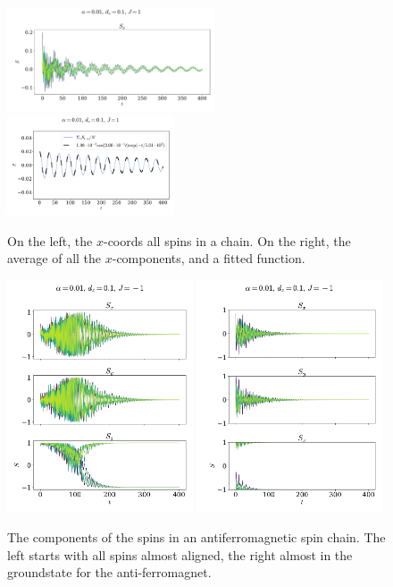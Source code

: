\documentclass{article}
\begin{document}
    \begin{figure}[H]
        \centering
        \includegraphics[width=0.55\textwidth]{../plots/2224.pdf}
        \includegraphics[width=0.44\textwidth]{../plots/2224fit.pdf}
        \caption{On the left, the $x$-coords all spins in a chain. On the right, the average of all the $x$-components, and a fitted function.}
        \label{one tilted dampend}
    \end{figure}


    \begin{figure}[H]
        \centering
        \includegraphics[width=0.49\textwidth]{../plots/2225.pdf}
        \includegraphics[width=0.49\textwidth]{../plots/22252.pdf}
        \caption{The components of the spins in an antiferromagnetic spin chain. The left starts with all spins almost aligned, the right almost in the groundstate for the anti-ferromagnet.}
        \label{one tilted dampend af}
    \end{figure}
\end{document}
